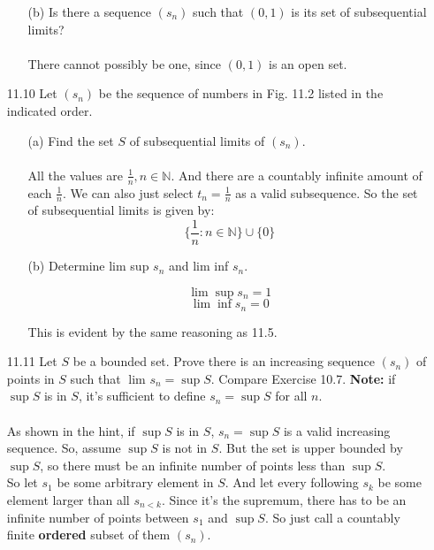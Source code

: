 \begin{itemize}
\begin{itemize}
      \item [(b)] Is there a sequence $(s_n)$ such that $(0,1)$ is its set of subsequential limits?\\\\

        There cannot possibly be one, since $(0,1)$ is an open set.
    \end{itemize}
  \item [11.10]
    Let $(s_n)$ be the sequence of numbers in Fig. 11.2 listed in the indicated order.
    \begin{itemize}
      \item [(a)] Find the set $S$ of subsequential limits of $(s_n)$.\\\\

        All the values are $\frac{1}{n}, n \in \mathds{N}$. And there are a countably infinite amount of each $\frac{1}{n}$. We can also just select $t_n = \frac{1}{n}$ as a valid subsequence. So the set of subsequential limits is given by:
        $$\{ \frac{1}{n} : n \in \mathds{N} \} \cup \{ 0 \}$$
      \item [(b)] Determine lim sup $s_n$ and lim inf $s_n$.
        
        $$\lim_{} \sup s_n = 1$$
        $$\lim_{} \inf s_n = 0$$

        This is evident by the same reasoning as 11.5.\\
    \end{itemize}
  \item [11.11]
    Let $S$ be a bounded set. Prove there is an increasing sequence $(s_n)$ of points in $S$ such that $\lim_{} s_n = \sup S$. Compare Exercise 10.7. \textbf{Note:} if $\sup S$ is in $S$, it's sufficient to define $s_n = \sup S$ for all $n$.\\\\

    As shown in the hint, if $\sup S$ is in $S$, $s_n = \sup S$ is a valid increasing sequence. So, assume $\sup S$ is not in $S$. But the set is upper bounded by $\sup S$, so there must be an infinite number of points less than $\sup S$.\\

    So let $s_1$ be some arbitrary element in $S$. And let every following $s_k$ be some element larger than all $s_{n < k}$. Since it's the supremum, there has to be an infinite number of points between $s_1$ and $\sup S$. So just call a countably finite \textbf{ordered} subset of them $(s_n)$.
\end{itemize}


